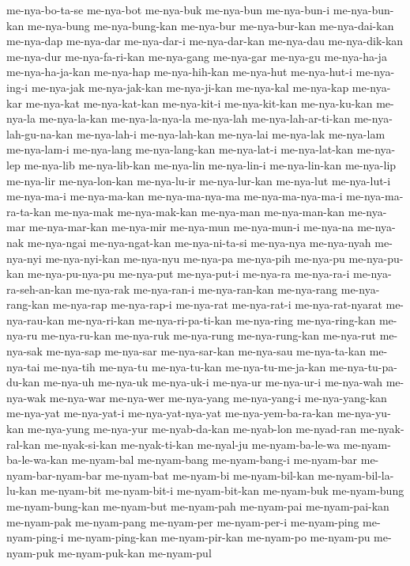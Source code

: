 {me-nya-bo-ta-se me-nya-bot me-nya-buk me-nya-bun me-nya-bun-i
me-nya-bun-kan me-nya-bung me-nya-bung-kan me-nya-bur me-nya-bur-kan
me-nya-dai-kan me-nya-dap me-nya-dar me-nya-dar-i me-nya-dar-kan
me-nya-dau me-nya-dik-kan me-nya-dur me-nya-fa-ri-kan me-nya-gang
me-nya-gar me-nya-gu me-nya-ha-ja me-nya-ha-ja-kan me-nya-hap
me-nya-hih-kan me-nya-hut me-nya-hut-i me-nya-ing-i me-nya-jak
me-nya-jak-kan me-nya-ji-kan me-nya-kal me-nya-kap me-nya-kar me-nya-kat
me-nya-kat-kan me-nya-kit-i me-nya-kit-kan me-nya-ku-kan me-nya-la
me-nya-la-kan me-nya-la-nya-la me-nya-lah me-nya-lah-ar-ti-kan
me-nya-lah-gu-na-kan me-nya-lah-i me-nya-lah-kan me-nya-lai me-nya-lak
me-nya-lam me-nya-lam-i me-nya-lang me-nya-lang-kan me-nya-lat-i
me-nya-lat-kan me-nya-lep me-nya-lib me-nya-lib-kan me-nya-lin
me-nya-lin-i me-nya-lin-kan me-nya-lip me-nya-lir me-nya-lon-kan
me-nya-lu-ir me-nya-lur-kan me-nya-lut me-nya-lut-i me-nya-ma-i
me-nya-ma-kan me-nya-ma-nya-ma me-nya-ma-nya-ma-i me-nya-ma-ra-ta-kan
me-nya-mak me-nya-mak-kan me-nya-man me-nya-man-kan me-nya-mar
me-nya-mar-kan me-nya-mir me-nya-mun me-nya-mun-i me-nya-na me-nya-nak
me-nya-ngai me-nya-ngat-kan me-nya-ni-ta-si me-nya-nya me-nya-nyah
me-nya-nyi me-nya-nyi-kan me-nya-nyu me-nya-pa me-nya-pih me-nya-pu
me-nya-pu-kan me-nya-pu-nya-pu me-nya-put me-nya-put-i me-nya-ra
me-nya-ra-i me-nya-ra-seh-an-kan me-nya-rak me-nya-ran-i me-nya-ran-kan
me-nya-rang me-nya-rang-kan me-nya-rap me-nya-rap-i me-nya-rat
me-nya-rat-i me-nya-rat-nyarat me-nya-rau-kan me-nya-ri-kan
me-nya-ri-pa-ti-kan me-nya-ring me-nya-ring-kan me-nya-ru me-nya-ru-kan
me-nya-ruk me-nya-rung me-nya-rung-kan me-nya-rut me-nya-sak me-nya-sap
me-nya-sar me-nya-sar-kan me-nya-sau me-nya-ta-kan me-nya-tai me-nya-tih
me-nya-tu me-nya-tu-kan me-nya-tu-me-ja-kan me-nya-tu-pa-du-kan me-nya-uh
me-nya-uk me-nya-uk-i me-nya-ur me-nya-ur-i me-nya-wah me-nya-wak
me-nya-war me-nya-wer me-nya-yang me-nya-yang-i me-nya-yang-kan me-nya-yat
me-nya-yat-i me-nya-yat-nya-yat me-nya-yem-ba-ra-kan me-nya-yu-kan
me-nya-yung me-nya-yur me-nyab-da-kan me-nyab-lon me-nyad-ran
me-nyak-ral-kan me-nyak-si-kan me-nyak-ti-kan me-nyal-ju me-nyam-ba-le-wa
me-nyam-ba-le-wa-kan me-nyam-bal me-nyam-bang me-nyam-bang-i me-nyam-bar
me-nyam-bar-nyam-bar me-nyam-bat me-nyam-bi me-nyam-bil-kan
me-nyam-bil-la-lu-kan me-nyam-bit me-nyam-bit-i me-nyam-bit-kan
me-nyam-buk me-nyam-bung me-nyam-bung-kan me-nyam-but me-nyam-pah
me-nyam-pai me-nyam-pai-kan me-nyam-pak me-nyam-pang me-nyam-per
me-nyam-per-i me-nyam-ping me-nyam-ping-i me-nyam-ping-kan me-nyam-pir-kan
me-nyam-po me-nyam-pu me-nyam-puk me-nyam-puk-kan me-nyam-pul
}
